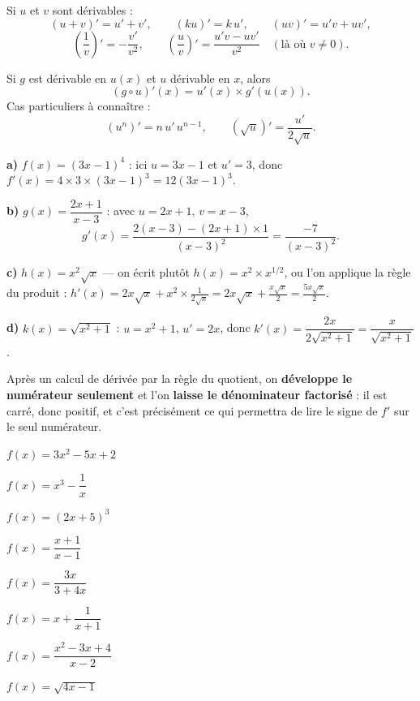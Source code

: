 \begin{propriete}[opérations]
Si $u$ et $v$ sont dérivables :
\[
  (u+v)' = u'+v', \qquad (ku)' = k\,u', \qquad (uv)' = u'v+uv',
\]
\[
  \left(\frac1v\right)' = -\frac{v'}{v^{2}}, \qquad
  \left(\frac uv\right)' = \frac{u'v-uv'}{v^{2}}
  \quad (\text{là où } v \neq 0).
\]
\end{propriete}

\begin{propriete}
Si $g$ est dérivable en $u(x)$ et $u$ dérivable en $x$, alors
\[
  \left(g \circ u\right)'(x) = u'(x)\times g'\!\left(u(x)\right).
\]
Cas particuliers à connaître :
\[
  \left(u^{n}\right)' = n\,u'\,u^{n-1}, \qquad
  \left(\sqrt u\right)' = \frac{u'}{2\sqrt u}.
\]
\end{propriete}

\begin{exemple}
\textbf{a)} $f(x) = (3x-1)^{4}$ : ici $u = 3x-1$ et $u' = 3$, donc
$f'(x) = 4\times3\times(3x-1)^{3} = 12(3x-1)^{3}$.

\textbf{b)} $g(x) = \dfrac{2x+1}{x-3}$ : avec $u = 2x+1$, $v = x-3$,
\[
  g'(x) = \frac{2(x-3)-(2x+1)\times1}{(x-3)^{2}}
  = \frac{-7}{(x-3)^{2}} .
\]

\textbf{c)} $h(x) = x^{2}\sqrt x$ — on écrit plutôt
$h(x) = x^{2}\times x^{1/2}$, ou l'on applique la règle du produit :
$h'(x) = 2x\sqrt x+x^{2}\times\frac{1}{2\sqrt x}
= 2x\sqrt x+\frac{x\sqrt x}{2} = \frac{5x\sqrt x}{2}$.

\textbf{d)} $k(x) = \sqrt{x^{2}+1}$ : $u = x^{2}+1$, $u' = 2x$, donc
$k'(x) = \dfrac{2x}{2\sqrt{x^{2}+1}} = \dfrac{x}{\sqrt{x^{2}+1}}$.
\end{exemple}

\begin{avertissement}
Après un calcul de dérivée par la règle du quotient, on \textbf{développe le
numérateur seulement} et l'on \textbf{laisse le dénominateur factorisé} : il
est carré, donc positif, et c'est précisément ce qui permettra de lire le
signe de $f'$ sur le seul numérateur.
\end{avertissement}

\begin{entrainement}
\exo[\niveau{1}] $f(x) = 3x^{2}-5x+2$

\exo[\niveau{1}] $f(x) = x^{3}-\dfrac{1}{x}$

\exo[\niveau{2}] $f(x) = (2x+5)^{3}$

\exo[\niveau{2}] $f(x) = \dfrac{x+1}{x-1}$

\exo[\niveau{2}] $f(x) = \dfrac{3x}{3+4x}$

\exo[\niveau{2}] $f(x) = x+\dfrac{1}{x+1}$

\exo[\niveau{3}] $f(x) = \dfrac{x^{2}-3x+4}{x-2}$

\exo[\niveau{3}] $f(x) = \sqrt{4x-1}$
\end{entrainement}


